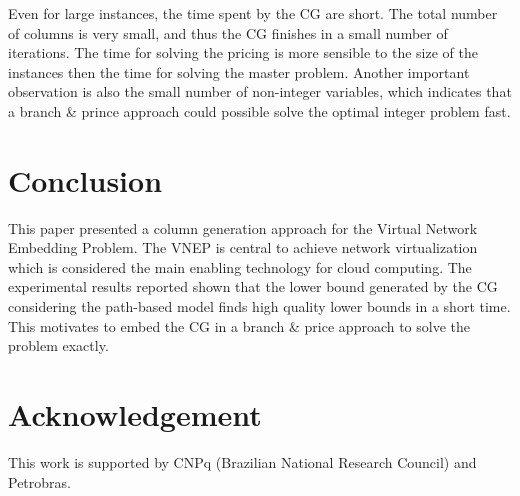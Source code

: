 \documentclass{llncs}
\begin{document}
Even for large instances, the time spent by the CG are short. 
The total number of columns is very small, and thus the CG finishes in a small number of iterations.
The time for solving the pricing is more sensible to the size of the instances then the time for solving the master problem.
Another important observation is also the small number of non-integer variables, which indicates that a branch \& prince approach
could possible solve the optimal integer problem fast.

\section{Conclusion}
\label{sec:conclusion}
This paper presented a column generation approach for the 
Virtual Network Embedding Problem. 
The VNEP is central to achieve network virtualization which is considered the main enabling technology for cloud computing.
The experimental results reported shown that the lower bound generated by the CG considering the path-based model
finds high quality lower bounds in a short time. This motivates to embed the CG in a branch \& price approach to solve the problem exactly.



\section*{Acknowledgement}
This work is supported by CNPq (Brazilian National Research Council) and Petrobras.




\end{document}
